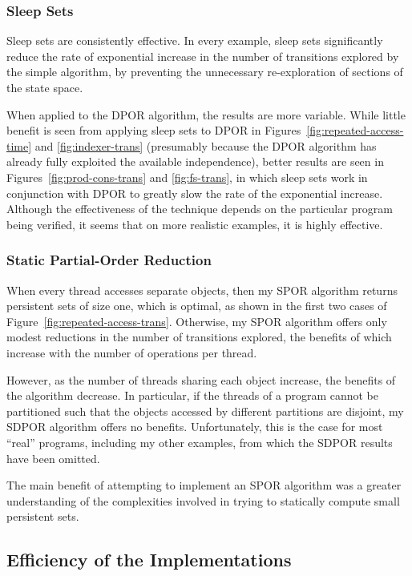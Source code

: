 \documentclass[12pt,a4paper,twoside,openright]{report}
\begin{document}
\subsubsection{Sleep Sets}
Sleep sets are consistently effective.
In every example,
sleep sets significantly reduce the
rate of exponential increase in
the number of transitions explored by the
simple algorithm, by preventing the
unnecessary re-exploration of sections
of the state space.

When applied to the DPOR algorithm, the results
are more variable. While little benefit is seen
from applying sleep sets to DPOR in
Figures~\ref{fig:repeated-access-time}
and \ref{fig:indexer-trans}
(presumably because the DPOR algorithm has already
fully exploited the available independence),
better results are seen in 
Figures~\ref{fig:prod-cons-trans} and \ref{fig:fs-trans},
in which sleep sets work
in conjunction with DPOR to greatly
slow the rate of the exponential increase.
Although the effectiveness of the technique
depends on the particular program being
verified, it seems that on more realistic
examples, it is highly effective.

\subsubsection{Static Partial-Order Reduction}
When every thread accesses separate objects,
then my SPOR algorithm returns persistent sets
of size one, which is optimal, as shown in the
first two cases of
Figure~\ref{fig:repeated-access-trans}.
Otherwise, my SPOR algorithm offers only
modest reductions in the number of transitions
explored, the benefits of which increase with
the number of operations per thread.

However, as the number of threads sharing
each object increase, the benefits of the
algorithm decrease. In particular, if the threads of
a program cannot be partitioned
such that the objects accessed by different
partitions are disjoint, my SDPOR algorithm
offers no benefits. Unfortunately, this
is the case for most ``real'' programs,
including my other examples, from which
the SDPOR results have been omitted.

The main benefit of attempting to implement
an SPOR algorithm was a greater understanding
of the complexities involved in trying to
statically compute small persistent sets.

\subsection{Efficiency of the Implementations}
\end{document}

